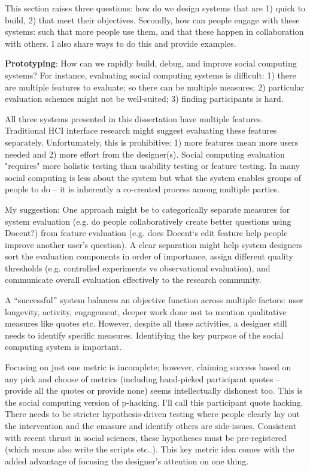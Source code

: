 This section raises three questions: how do we design systems that are 1) quick to build, 2) that meet their objectives. Secondly, how can people engage with these systems: such that more people use them, and that these happen in collaboration with others. I also share ways to do this and provide examples.

\textbf{Prototyping}: How can we rapidly build, debug, and improve social computing systems? For instance, evaluating social computing systems is difficult: 1) there are multiple features to evaluate; so there can be multiple measures; 2) particular evaluation schemes might not be well-suited; 3) finding participants is hard.

All three systems presented in this dissertation have multiple features. Traditional HCI interface research might suggest evaluating these features separately. Unfortumately, this is prohibitive: 1) more features mean more users needed and 2) more effort from the designer(s). Social computing evaluation "requires" more holistic testing than usability testing or feature testing. In many social computing is less about the system but what the system enables groups of people to do -- it is inherently a co-created process among multiple parties. 

My suggestion: One approach might be to categorically separate measures for system evaluation (e.g. do people collaboratively create better questions using Docent?) from feature evaluation (e.g. does Docent‘s edit feature help people improve another user’s question). A clear separation might help system designers sort the evaluation components in order of importance, assign different quality thresholds (e.g. controlled experiments vs observational evaluation), and communicate overall evaluation effectively to the research community.

A “successful” system balances an objective function across multiple factors: user longevity, activity, engagement, deeper work done not to mention qualitative measures like quotes etc. However, despite all these activities, a designer still needs to identify specific measures. Identifying the key purpsoe of the social computing system is important. 

Focusing on just one metric is incomplete; however, claiming success based on any pick and choose of metrics (including hand-picked participant quotes -- provide all the quotes or provide none) seems intellectually dishonest too. This is the social computing version of p-hacking. I'll call this participant quote hacking. There needs to be stricter hypothesis-driven testing where people clearly lay out the intervention and the emasure and identify others are side-issues. Consistent with recent thrust in social sciences, these hypotheses must be pre-registered (which means also write the scripts etc..). This key metric idea comes with the added advantage of focusing the designer's attention on one thing.

